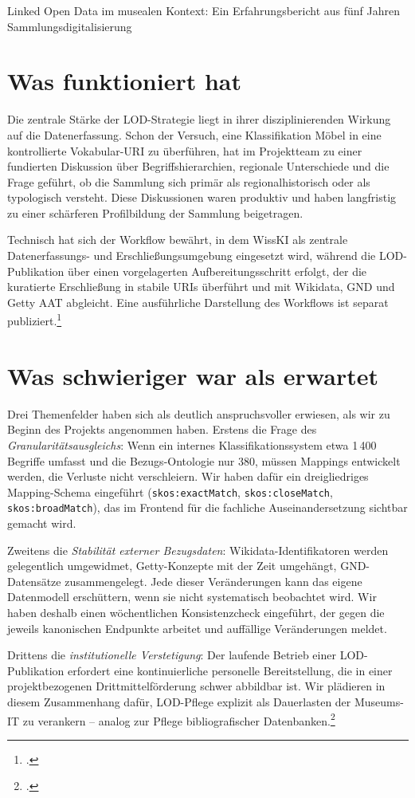 \begin{beitrag}{Linked Open Data im musealen Kontext: Ein Erfahrungsbericht aus fünf Jahren Sammlungsdigitalisierung}
\section{Was funktioniert hat}
Die zentrale Stärke der LOD-Strategie liegt in ihrer disziplinierenden Wirkung auf die Datenerfassung. Schon der Versuch, eine Klassifikation \glqq Möbel\grqq{} in eine kontrollierte Vokabular-URI zu überführen, hat im Projektteam zu einer fundierten Diskussion über Begriffshierarchien, regionale Unterschiede und die Frage geführt, ob die Sammlung sich primär als regionalhistorisch oder als typologisch versteht. Diese Diskussionen waren produktiv und haben langfristig zu einer schärferen Profilbildung der Sammlung beigetragen.

Technisch hat sich der Workflow bewährt, in dem WissKI als zentrale Datenerfassungs- und Erschließungsumgebung eingesetzt wird, während die LOD-Publikation über einen vorgelagerten Aufbereitungsschritt erfolgt, der die kuratierte Erschließung in stabile URIs überführt und mit Wikidata, GND und Getty AAT abgleicht. Eine ausführliche Darstellung des Workflows ist separat publiziert.\footcite[141--144]{ihlow2024-museum-lod}

\section{Was schwieriger war als erwartet}
Drei Themenfelder haben sich als deutlich anspruchsvoller erwiesen, als wir zu Beginn des Projekts angenommen haben. Erstens die Frage des \emph{Granularitätsausgleichs}: Wenn ein internes Klassifikationssystem etwa 1\,400 Begriffe umfasst und die Bezugs-Ontologie nur 380, müssen Mappings entwickelt werden, die Verluste nicht verschleiern. Wir haben dafür ein dreigliedriges Mapping-Schema eingeführt (\texttt{skos:exactMatch}, \texttt{skos:closeMatch}, \texttt{skos:broadMatch}), das im Frontend für die fachliche Auseinandersetzung sichtbar gemacht wird.

Zweitens die \emph{Stabilität externer Bezugsdaten}: Wikidata-Identifikatoren werden gelegentlich umgewidmet, Getty-Konzepte mit der Zeit umgehängt, GND-Datensätze zusammengelegt. Jede dieser Veränderungen kann das eigene Datenmodell erschüttern, wenn sie nicht systematisch beobachtet wird. Wir haben deshalb einen wöchentlichen Konsistenzcheck eingeführt, der gegen die jeweils kanonischen Endpunkte arbeitet und auffällige Veränderungen meldet.

Drittens die \emph{institutionelle Verstetigung}: Der laufende Betrieb einer LOD-Publikation erfordert eine kontinuierliche personelle Bereitstellung, die in einer projektbezogenen Drittmittelförderung schwer abbildbar ist. Wir plädieren in diesem Zusammenhang dafür, LOD-Pflege explizit als Dauerlasten der Museums-IT zu verankern -- analog zur Pflege bibliografischer Datenbanken.\footcite[siehe][70]{jansen2025-lod-finanzierung}


\end{beitrag}
